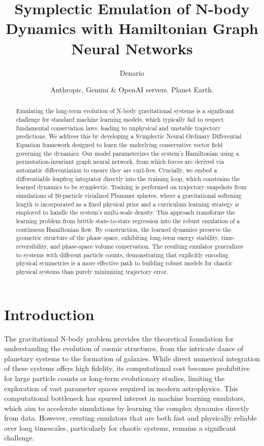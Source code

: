 \documentclass[]{article}
\begin{document}
\title{Symplectic Emulation of N-body Dynamics with Hamiltonian Graph Neural Networks}

\author{Denario}
\date{Anthropic, Gemini \& OpenAI servers. Planet Earth.}

\maketitle
\begin{abstract}
Emulating the long-term evolution of N-body gravitational systems is a significant challenge for standard machine learning models, which typically fail to respect fundamental conservation laws, leading to unphysical and unstable trajectory predictions. We address this by developing a Symplectic Neural Ordinary Differential Equation framework designed to learn the underlying conservative vector field governing the dynamics. Our model parameterizes the system's Hamiltonian using a permutation-invariant graph neural network, from which forces are derived via automatic differentiation to ensure they are curl-free. Crucially, we embed a differentiable leapfrog integrator directly into the training loop, which constrains the learned dynamics to be symplectic. Training is performed on trajectory snapshots from simulations of 50-particle virialized Plummer spheres, where a gravitational softening length is incorporated as a fixed physical prior and a curriculum learning strategy is employed to handle the system's multi-scale density. This approach transforms the learning problem from brittle state-to-state regression into the robust emulation of a continuous Hamiltonian flow. By construction, the learned dynamics preserve the geometric structure of the phase space, exhibiting long-term energy stability, time-reversibility, and phase-space volume conservation. The resulting emulator generalizes to systems with different particle counts, demonstrating that explicitly encoding physical symmetries is a more effective path to building robust models for chaotic physical systems than purely minimizing trajectory error.
\end{abstract}








\section{Introduction}
\label{sec:intro}
The gravitational N-body problem provides the theoretical foundation for understanding the evolution of cosmic structures, from the intricate dance of planetary systems to the formation of galaxies. While direct numerical integration of these systems offers high fidelity, its computational cost becomes prohibitive for large particle counts or long-term evolutionary studies, limiting the exploration of vast parameter spaces required in modern astrophysics. This computational bottleneck has spurred interest in machine learning emulators, which aim to accelerate simulations by learning the complex dynamics directly from data. However, creating emulators that are both fast and physically reliable over long timescales, particularly for chaotic systems, remains a significant challenge.
\end{document}
